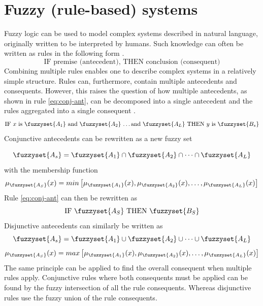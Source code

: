 \section{Fuzzy (rule-based) systems}
Fuzzy logic can be used to model complex systems described in natural language, originally written to be interpreted by humans. Such knowledge can often be written as rules in the following form \cite{ross2009fuzzy}.
\begin{equation}
    \text{IF premise (antecedent), THEN conclusion (consequent)}
\end{equation}
Combining multiple rules enables one to describe complex systems in a relatively simple structure. Rules can, furthermore, contain multiple antecedents and consequents. However, this raises the question of how multiple antecedents, as shown in rule \ref{eq:conj-ant}, can be  decomposed into a single antecedent and the rules aggregated into a single consequent \cite{ross2009fuzzy}.
\begin{equation}
    \text {IF $x$ is $\fuzzyset{A_1}$ and $\fuzzyset{A_2}$ \dots and $\fuzzyset{A_L}$ THEN $y$ is $\fuzzyset{B_s}$}
    \label{eq:conj-ant}
\end{equation}
Conjunctive antecedents can be rewritten as a new fuzzy set

\[ \fuzzyset{A_s}=\fuzzyset{A_1}\cap \fuzzyset{A_2} \cap \dots \cap \fuzzyset{A_L} \]
with the membership function
\[ \mu_{\fuzzyset{A_S}}(x)=min \left [\mu_{\fuzzyset{A_1}}(x),\mu_{\fuzzyset{A_2}}(x),\dots,\mu_{\fuzzyset{A_L}}(x) \right ] \]
Rule \ref{eq:conj-ant} can then be rewritten as
\[ \text{IF $\fuzzyset{A_S}$ THEN $\fuzzyset{B_S}$} \]
Disjunctive antecedents can similarly be written as
\[ \fuzzyset{A_s}=\fuzzyset{A_1}\cup \fuzzyset{A_2} \cup \dots \cup \fuzzyset{A_L} \]
\[ \mu_{\fuzzyset{A_S}}(x)=max \left [\mu_{\fuzzyset{A_1}}(x),\mu_{\fuzzyset{A_2}}(x),\dots,\mu_{\fuzzyset{A_L}}(x) \right ] \]
The same principle can be applied to find the overall consequent when multiple rules apply. Conjunctive rules where both consequents must be applied can be found by  the fuzzy intersection of all the rule consequents. Whereas disjunctive rules use the fuzzy union of the rule consequents.



